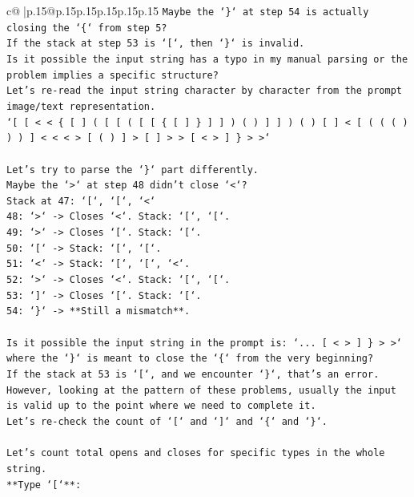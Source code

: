 \documentclass{article}
\begin{document}
{\begin{supertabular}{c@{$\;$}|p{.15\linewidth}@{}p{.15\linewidth}p{.15\linewidth}p{.15\linewidth}p{.15\linewidth}p{.15\linewidth}}
{{{\texttt{Maybe the `\}` at step 54 is actually closing the `\{` from step 5?} \\
\texttt{If the stack at step 53 is `{[}`, then `\}` is invalid.} \\
\texttt{Is it possible the input string has a typo in my manual parsing or the problem implies a specific structure?} \\
\texttt{Let's re{-}read the input string character by character from the prompt image/text representation.} \\
\texttt{`{[} {[} < < \{ {[} {]} ( {[} {[} ( {[} {[} \{ {[} {]} \} {]} {]} ) ( ) {]} {]} ) ( ) {[} {]} < {[} ( ( ( ) ) ) {]} < < < > {[} ( ) {]} > {[} {]} > > {[} < > {]} \} > >`} \\
\\ 
\texttt{Let's try to parse the `\}` part differently.} \\
\texttt{Maybe the `>` at step 48 didn't close `<`?} \\
\texttt{Stack at 47: `{[}`, `{[}`, `<`} \\
\texttt{48: `>` {-}> Closes `<`. Stack: `{[}`, `{[}`.} \\
\texttt{49: `>` {-}> Closes `{[}`. Stack: `{[}`.} \\
\texttt{50: `{[}` {-}> Stack: `{[}`, `{[}`.} \\
\texttt{51: `<` {-}> Stack: `{[}`, `{[}`, `<`.} \\
\texttt{52: `>` {-}> Closes `<`. Stack: `{[}`, `{[}`.} \\
\texttt{53: `{]}` {-}> Closes `{[}`. Stack: `{[}`.} \\
\texttt{54: `\}` {-}> **Still a mismatch**.} \\
\\ 
\texttt{Is it possible the input string in the prompt is: `... {[} < > {]} \} > >` where the `\}` is meant to close the `\{` from the very beginning?} \\
\texttt{If the stack at 53 is `{[}`, and we encounter `\}`, that's an error.} \\
\texttt{However, looking at the pattern of these problems, usually the input is valid up to the point where we need to complete it.} \\
\texttt{Let's re{-}check the count of `{[}` and `{]}` and `\{` and `\}`.} \\
\\ 
\texttt{Let's count total opens and closes for specific types in the whole string.} \\
\texttt{**Type `{[}`**:} \\
}}}
\end{supertabular}}
\end{document}
